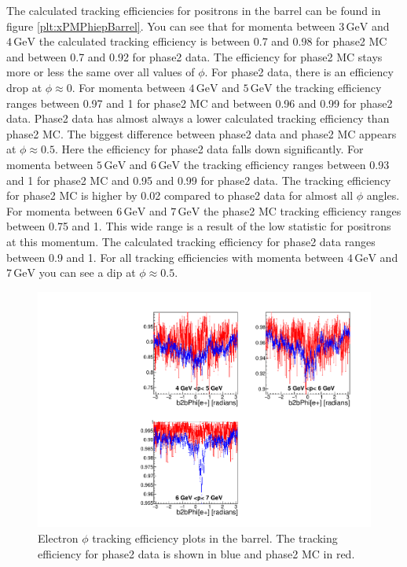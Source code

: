 \documentclass[a4paper,11pt,twosided,final,german,openbib,pdftex,listof=totoc,bibliography=totoc]{scrbook}
\begin{document}
The calculated tracking efficiencies for positrons in the barrel can be found in figure \ref{plt:xPMPhiepBarrel}. You can see that for momenta between $3\,\textrm{GeV}$ and $4\,\textrm{GeV}$ the calculated tracking efficiency is between 0.7 and 0.98 for phase2 MC and between 0.7 and 0.92 for phase2 data. The efficiency for phase2 MC stays more or less the same over all values of $\phi$. For phase2 data, there is an efficiency drop at $\phi \approx 0$.
For momenta between $4\,\textrm{GeV}$ and $5\,\textrm{GeV}$ the tracking efficiency ranges between 0.97 and 1 for phase2 MC and between 0.96 and 0.99 for phase2 data. Phase2 data has almost always a lower calculated tracking efficiency than phase2 MC.
The biggest difference between phase2 data and phase2 MC appears at $\phi \approx 0.5$. Here the efficiency for phase2 data falls down significantly. 
For momenta between $5\,\textrm{GeV}$ and $6\,\textrm{GeV}$ the tracking efficiency ranges between 0.93 and 1 for phase2 MC and 0.95  and 0.99 for phase2 data. The tracking efficiency for phase2 MC is higher by 0.02 compared to phase2 data for almost all $\phi$ angles. 
For momenta between $6\,\textrm{GeV}$ and $7\,\textrm{GeV}$ the phase2 MC tracking efficiency ranges between 0.75 and 1. This wide range is a result of the low statistic for positrons at this momentum. The calculated tracking efficiency for phase2 data ranges between 0.9 and 1. For all tracking efficiencies with momenta between $4\,\textrm{GeV}$ and $7\,\textrm{GeV}$ you can see a dip at $\phi \approx 0.5$.

\begin{figure}[!htbp]
	\centering
	\includegraphics[width=\textwidth]{Plots/master/xPMPhiemBarrel}
	\caption[Momentum $\phi$ Electron Barrel Efficiency Phase2]{Electron $\phi$ tracking efficiency plots in the barrel. The tracking efficiency for phase2 data is shown in blue and phase2 MC in red.}
	\label{plt:xPMPhiemBarrel}
\end{figure}
\end{document}
